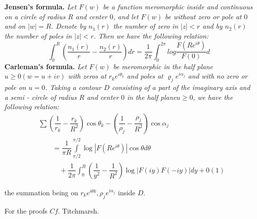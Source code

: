 \noindent
\textbf{Jensen's formula.} \textit{Let $F(w)$ be a function
 meromorphic inside and continuous on a circle of radius $R$ and
 center $0$, and let $F(w)$ be without zero or pole at $0$ and on
 $|w|= R$. Denote by $n_1(r)$ the number of zero in $|z| < r$ and by
 $n_2(r)$ the number of poles in $|z| < r$. Then we have the
 following relation: } 
$$
\int^R_0 \left( \frac{n_1(r)}{r} - \frac{n_2(r)}{r} \right) dr =
\frac{1}{2\pi} \int^{2 \pi}_{0} log \frac{F(Re^{i \theta})}{F(0)}d 
$$
\textbf{Carleman's formula.} \textit{Let $F(w)$ be meromorphic in the
 half plane $u \ge 0 (w = u+ iv)$ with zeros at $r_k e^{i \theta_k}$
 and poles at $\varrho_j e^{i \alpha_j}$ and with no zero or pole on
 $u = 0$. Taking a contour $D$ consisting of a part of the imaginary
 axis and a semi - circle of radius $R$ and center $0$ in the half
 plane\pageoriginale $u \ge 0$, we have the following relation:} 
\begin{align*}
&\sum \left(\dfrac{1}{r_k} - \dfrac{r_k}{R^2}\right) \cos \theta_k
-\left(\dfrac{1}{\rho_j}- \dfrac{\rho_j}{R^2}\right) \cos \alpha_j\\ 
&\qquad=\dfrac{1}{\pi R} \int\limits^{\pi /2}_{\pi /2} \log |F (Re^{i \theta})| \cos
\theta d \theta\\ 
&\qquad\quad+ \dfrac{1}{2 \pi} \int^R_0 \left(\dfrac{1}{y^2} -
\dfrac{1}{R^2}\right) \log |F(iy) F(-iy)| dy + 0(1)
\end{align*}

the summation being on $r_k e^{i \theta k}, \rho_j e^{i \alpha_j}$ inside $D$.

For the proofs $Cf$. Titchmarsh.
